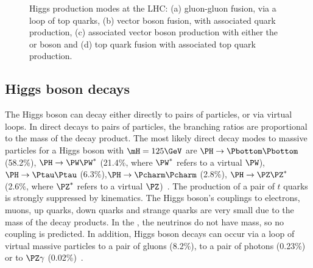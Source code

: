 \begin{figure}[h!]
{\begin{fmfgraph*}
  \end{fmfgraph*} 
  }
  \caption{Higgs production modes at the LHC: (a) gluon-gluon fusion, via a loop of top quarks, (b) vector boson fusion, with associated quark production, (c) associated vector boson production with either the \PZ or \PW boson and (d) top quark fusion with associated top quark production. }
  \label{fig:theory:higgsproduction}
  \end{figure}

\subsection{Higgs boson decays}
\label{th:sec:higgs_decays}

The \SM Higgs boson can decay either directly to pairs of particles, or via virtual loops.
In direct decays to pairs of particles, the  branching ratios are proportional to the mass of the decay product. The most likely direct decay modes to massive particles for a \SM Higgs boson with $\mH=125\GeV$ are $\PH \rightarrow \Pbottom \Pbottom$ (58.2\%), $\PH \rightarrow \PW \PW^{*}$ (21.4\%, where $\PW^{*}$ refers to a virtual $\PW$), $\PH \rightarrow \Ptau \Ptau$ (6.3\%),$\PH \rightarrow \Pcharm \Pcharm$ (2.8\%), $\PH \rightarrow \PZ \PZ^{*}$ (2.6\%, where $\PZ^{*}$ refers to a virtual $\PZ$)~\cite{LHCHXSWGRY4}. The production of a pair of $t$ quarks is strongly suppressed by kinematics. The Higgs boson's couplings to electrons, muons, up quarks, down quarks and strange quarks are very small due to the mass of the decay products. In the \SM, the neutrinos do not have mass, so no \SM coupling is predicted.
In addition, Higgs boson decays can occur via a loop of virtual massive particles to a pair of gluons (8.2\%), to a pair of photons (0.23\%) or to $\PZ\gamma$ (0.02\%)~\cite{LHCHXSWGRY4}. 

